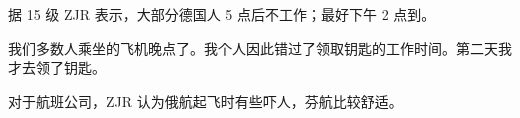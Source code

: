 
据 15 级 ZJR 表示，大部分德国人 5 点后不工作；最好下午 2 点到。

我们多数人乘坐的飞机晚点了。我个人因此错过了领取钥匙的工作时间。第二天我才去领了钥匙。

对于航班公司，ZJR 认为俄航起飞时有些吓人，芬航比较舒适。